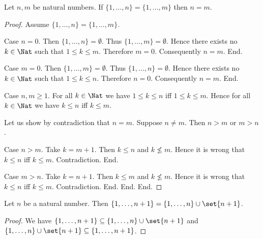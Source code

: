 \documentclass[../arithmetic.tex]{subfiles}
\begin{document}
  \begin{forthel}
    \begin{proposition}
      Let $n, m$ be natural numbers.
      If $\{ 1, \dots, n \} = \{ 1, \dots, m \}$ then $n = m$.
    \end{proposition}
    \begin{proof}
      Assume $\{ 1, \dots, n \} = \{ 1, \dots, m \}$.

      Case $n = 0$.
        Then $\{ 1, \dots, n \} = \emptyset$.
        Thus $\{ 1, \dots, m \} = \emptyset$.
        Hence there exists no $k \in \Nat$ such that $1 \leq k \leq m$.
        Therefore $m = 0$.
        Consequently $n = m$.
      End.

      Case $m = 0$.
        Then $\{ 1, \dots, m \} = \emptyset$.
        Thus $\{ 1, \dots, n \} = \emptyset$.
        Hence there exists no $k \in \Nat$ such that $1 \leq k \leq n$.
        Therefore $n = 0$.
        Consequently $n = m$.
      End.

      Case $n, m \geq 1$.
        For all $k \in \Nat$ we have $1 \leq k \leq n$ iff $1 \leq k \leq m$.
        Hence for all $k \in \Nat$ we have $k \leq n$ iff $k \leq m$.

        Let us show by contradiction that $n = m$.
          Suppose $n \neq m$.
          Then $n > m$ or $m > n$.

          Case $n > m$.
            Take $k = m + 1$.
            Then $k \leq n$ and $k \nleq m$.
            Hence it is wrong that $k \leq n$ iff $k \leq m$.
            Contradiction.
          End.

          Case $m > n$.
            Take $k = n + 1$.
            Then $k \leq m$ and $k \nleq m$.
            Hence it is wrong that $k \leq n$ iff $k \leq m$.
            Contradiction.
          End.
        End.
      End.
    \end{proof}
  \end{forthel}

  \begin{forthel}
    \begin{proposition}
      Let $n$ be a natural number.
      Then $\{ 1, \dots, n + 1 \} = \{ 1, \dots, n \} \cup \set{n + 1}$.
    \end{proposition}
    \begin{proof}
      We have
      $\{ 1, \dots, n + 1 \} \subseteq \{ 1, \dots, n \} \cup \set{n + 1}$ and
      $\{ 1, \dots, n \} \cup \set{n + 1} \subseteq \{ 1, \dots, n + 1 \}$.
    \end{proof}
  \end{forthel}
\end{document}
